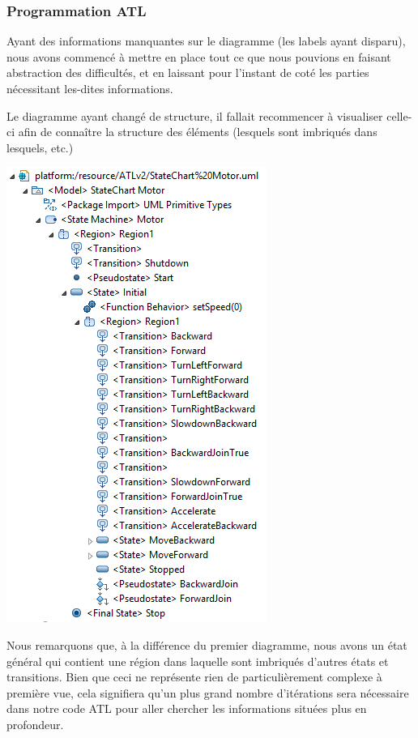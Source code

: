\documentclass[french, 12pt, a4paper]{article}
\begin{document}
    \subsubsection{Programmation ATL}
    Ayant des informations manquantes sur le diagramme (les labels ayant disparu), nous avons commencé à mettre en place tout ce que nous pouvions en faisant abstraction des difficultés, et en laissant pour l'instant de coté les parties nécessitant les-dites informations. 
    
    Le diagramme ayant changé de structure, il fallait recommencer à visualiser celle-ci afin de connaître la structure des éléments (lesquels sont imbriqués dans lesquels, etc.)
    
	\begin{center}
			\captionsetup{type=figure}
			\includegraphics[scale=0.7]{Images/structureV2.png}
	\end{center}
	
	Nous remarquons que, à la différence du premier diagramme, nous avons un état général qui contient une région dans laquelle sont imbriqués d'autres états et transitions. Bien que ceci ne représente rien de particulièrement complexe à première vue, cela signifiera qu'un plus grand nombre d'itérations sera nécessaire dans notre code ATL pour aller chercher les informations situées plus en profondeur.
    
\end{document}
